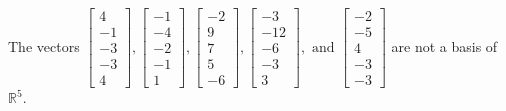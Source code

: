 \begin{exercise}
\begin{exerciseStatement}
  \end{exerciseStatement}
  \begin{exerciseAnswer}
   The vectors \(\left[\begin{array}{r}
4 \\
-1 \\
-3 \\
-3 \\
4
\end{array}\right] , \left[\begin{array}{r}
-1 \\
-4 \\
-2 \\
-1 \\
1
\end{array}\right] , \left[\begin{array}{r}
-2 \\
9 \\
7 \\
5 \\
-6
\end{array}\right] , \left[\begin{array}{r}
-3 \\
-12 \\
-6 \\
-3 \\
3
\end{array}\right] , \text{ and } \left[\begin{array}{r}
-2 \\
-5 \\
4 \\
-3 \\
-3
\end{array}\right]\) 
  	 are not  a basis of \(\mathbb{R}^5\).
  


  \end{exerciseAnswer}
\end{exercise}